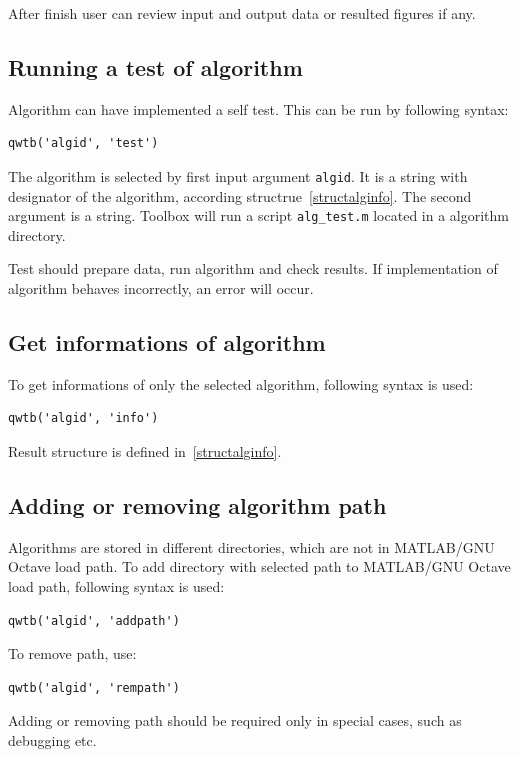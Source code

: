 \documentclass[12pt,a4paper,oneside]{report} %
\newcommand{\li}[1]{\lstinline{#1}}     %
\def\matlab{{\sc MATLAB}\xspace}
\def\octave{{\sc GNU Octave}\xspace}
\def\mgo{\matlab/\octave\xspace}
\begin{document}
After finish user can review input and output data or resulted figures if any.

\subsection{Running a test of algorithm} %
Algorithm can have implemented a self test. This can be run by following syntax:

\begin{lstlisting}
qwtb('algid', 'test')
\end{lstlisting}

The algorithm is selected by first input argument \li{algid}. It is a string with
designator of the algorithm, according structrue~\ref{structalginfo}. The second argument is a
string. Toolbox will run a script \li{alg_test.m} located in a algorithm directory.

Test should prepare data, run algorithm and check results. If implementation of algorithm
behaves incorrectly, an error will occur.

\subsection{Get informations of algorithm} %
To get informations of only the selected algorithm, following syntax is used:
\begin{lstlisting}
qwtb('algid', 'info')
\end{lstlisting}

Result structure is defined in~\ref{structalginfo}.

\subsection{Adding or removing algorithm path} %
Algorithms are stored in different directories, which are not in \mgo load path. To add directory
with selected path to \mgo load path, following syntax is used:

\begin{lstlisting}
qwtb('algid', 'addpath')
\end{lstlisting}

To remove path, use:

\begin{lstlisting}
qwtb('algid', 'rempath')
\end{lstlisting}

Adding or removing path should be required only in special cases, such as debugging etc.
\end{document}

